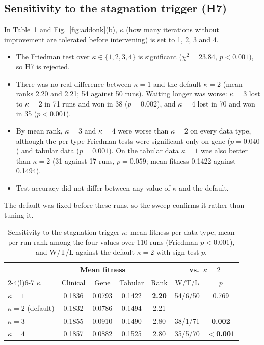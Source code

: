 \documentclass[pdflatex,sn-basic]{sn-jnl}
\begin{document}
\subsection{Sensitivity to the stagnation trigger (H7)}\label{sec:kappa}
In Table~\ref{tab:kappa} and Fig.~\ref{fig:addonk}(b), $\kappa$ (how many iterations without improvement are tolerated before intervening) is set to 1, 2, 3 and 4.
\begin{itemize}
\item The Friedman test over $\kappa\in\{1,2,3,4\}$ is significant ($\chi^2=23.84$, $p<0.001$), so H7 is rejected.
\item There was no real difference between $\kappa=1$ and the default $\kappa=2$ (mean ranks 2.20 and 2.21; 54 against 50 runs). Waiting longer was worse: $\kappa=3$ lost to $\kappa=2$ in 71 runs and won in 38 ($p=0.002$), and $\kappa=4$ lost in 70 and won in 35 ($p<0.001$).
\item By mean rank, $\kappa=3$ and $\kappa=4$ were worse than $\kappa=2$ on every data type, although the per-type Friedman tests were significant only on gene ($p=0.040$) and tabular data ($p=0.001$). On the tabular data $\kappa=1$ was also better than $\kappa=2$ (31 against 17 runs, $p=0.059$; mean fitness 0.1422 against 0.1494).
\item Test accuracy did not differ between any value of $\kappa$ and the default.
\end{itemize}
The default was fixed before these runs, so the sweep confirms it rather than tuning it.

\begin{table}[t]
\centering
\caption{Sensitivity to the stagnation trigger $\kappa$: mean fitness per data type, mean per-run rank among the four values over 110 runs (Friedman $p<0.001$), and W/T/L against the default $\kappa=2$ with sign-test $p$.}
\label{tab:kappa}
\footnotesize
\setlength{\tabcolsep}{2.6pt}
\begin{tabular}{@{}lcccccc@{}}
\toprule
& \multicolumn{3}{c}{Mean fitness} & & \multicolumn{2}{c}{vs.\ $\kappa=2$} \\
\cmidrule(lr){2-4}\cmidrule(l){6-7}
$\kappa$ & Clinical & Gene & Tabular & Rank & W/T/L & $p$ \\
\midrule
$\kappa=1$ & 0.1836 & 0.0793 & 0.1422 & \textbf{2.20} & 54/6/50 & 0.769 \\
$\kappa=2$ (default) & 0.1832 & 0.0786 & 0.1494 & 2.21 & -- & -- \\
$\kappa=3$ & 0.1855 & 0.0910 & 0.1490 & 2.80 & 38/1/71 & \textbf{0.002} \\
$\kappa=4$ & 0.1857 & 0.0882 & 0.1525 & 2.80 & 35/5/70 & \textbf{$<$0.001} \\
\bottomrule
\end{tabular}
\end{table}
\end{document}
